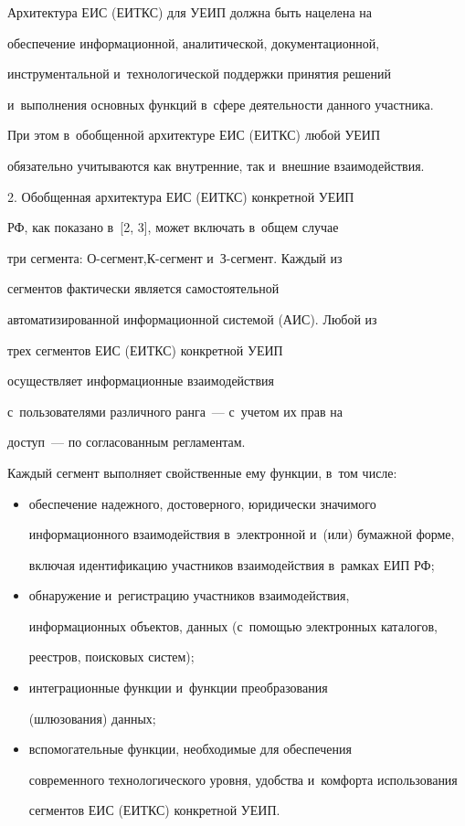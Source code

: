      

     Архитектура ЕИС (ЕИТКС) для УЕИП должна быть нацелена на 

обеспечение информационной, аналитической, документационной, 

инструментальной и~технологической поддержки принятия решений 

и~выполнения основных функций в~сфере деятельности данного участника. 

При этом в~обобщенной архитектуре ЕИС (ЕИТКС) любой УЕИП 

обязательно учитываются как внутренние, так и~внешние взаимодействия.



     \smallskip

     

2.  Обобщенная архитектура ЕИС (ЕИТКС) конкретной УЕИП 

РФ, как показано в~[2, 3], может включать в~общем случае 

три сегмента: О-сег\-мент,\linebreak К-сегмент и~З-сегмент. Каждый из 

сегментов фактически является самостоятельной 

автоматизированной информационной системой (АИС). Любой из 

трех сегментов ЕИС (ЕИТКС) конкретной УЕИП 

осуществляет информационные взаимодействия 

с~пользователями различного ранга~--- с~учетом их прав на 

доступ~--- по согласованным регламентам.



     Каждый сегмент выполняет свойственные ему функции, в~том числе:

     \begin{itemize}

\item обеспечение надежного, достоверного, юридически значимого 

информационного взаимодействия в~электронной и~(или) бумажной форме, 

включая идентификацию участников взаимодействия в~рамках ЕИП РФ;

     \item обнаружение и~регистрацию участников взаимодействия, 

информационных объектов, данных (с~по\-мощью электронных каталогов, 

реестров, поисковых систем);

     \item интеграционные функции и~функции преобразования 

(шлюзования) данных;

     \item вспомогательные функции, необходимые для обеспечения 

современного технологического уровня, удобства и~комфорта использования 

сегментов ЕИС (ЕИТКС) конкретной УЕИП.

     \end{itemize}

